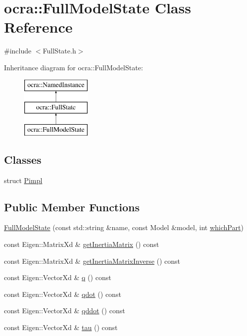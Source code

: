\hypertarget{classocra_1_1FullModelState}{}\section{ocra\+:\+:Full\+Model\+State Class Reference}
\label{classocra_1_1FullModelState}


{\ttfamily \#include $<$Full\+State.\+h$>$}

Inheritance diagram for ocra\+:\+:Full\+Model\+State\+:\begin{figure}[H]
\begin{center}
\leavevmode
\includegraphics[height=3.000000cm]{dd/d54/classocra_1_1FullModelState}
\end{center}
\end{figure}
\subsection*{Classes}
\begin{DoxyCompactItemize}
\item 
struct \hyperlink{structocra_1_1FullModelState_1_1Pimpl}{Pimpl}
\end{DoxyCompactItemize}
\subsection*{Public Member Functions}
\begin{DoxyCompactItemize}
\item 
\hyperlink{classocra_1_1FullModelState_a2fc326508bd940f338c614c18549a7ba}{Full\+Model\+State} (const std\+::string \&name, const Model \&model, int \hyperlink{classocra_1_1FullState_a75ec7c039df8cb8608ebf34f7b779be5}{which\+Part})
\item 
const Eigen\+::\+Matrix\+Xd \& \hyperlink{classocra_1_1FullModelState_a988dec9567fd2b083ecfb6f3348d9a09}{get\+Inertia\+Matrix} () const
\item 
const Eigen\+::\+Matrix\+Xd \& \hyperlink{classocra_1_1FullModelState_adf7ce7128a112c3f2b6367b6c0f6b9a2}{get\+Inertia\+Matrix\+Inverse} () const
\item 
const Eigen\+::\+Vector\+Xd \& \hyperlink{classocra_1_1FullModelState_a3a560064b1be8bd1579382aa08686904}{q} () const
\item 
const Eigen\+::\+Vector\+Xd \& \hyperlink{classocra_1_1FullModelState_a034c567bae39a29f391f6462f52b0834}{qdot} () const
\item 
const Eigen\+::\+Vector\+Xd \& \hyperlink{classocra_1_1FullModelState_a2578e15742268c14fb4ce5f26033256e}{qddot} () const
\item 
const Eigen\+::\+Vector\+Xd \& \hyperlink{classocra_1_1FullModelState_aa774cf6a9a50ed4b50c037ae981d2c7b}{tau} () const
\end{DoxyCompactItemize}
